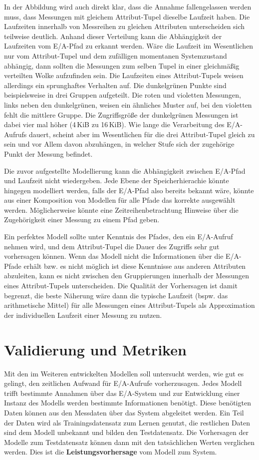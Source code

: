 \documentclass[
	12pt,
	a4paper,
	BCOR10mm,
	DIV14,
	listof=totoc,
	bibliography=totoc,
	headsepline
]{scrreprt}
\begin{document}
In der Abbildung wird auch direkt klar, dass die Annahme fallengelassen werden muss, dass Messungen mit gleichem Attribut-Tupel dieselbe Laufzeit haben. Die Laufzeiten innerhalb von Messreihen zu gleichen Attributen unterscheiden sich teilweise deutlich.
Anhand dieser Verteilung kann die Abhängigkeit der Laufzeiten vom E/A-Pfad zu erkannt werden.
Wäre die Laufzeit im Wesentlichen nur vom Attribut-Tupel und dem \glqq zufälligen\grqq{} momentanen Systemzustand abhängig, dann sollten die Messungen zum selben Tupel in einer gleichmäßig verteilten Wolke aufzufinden sein.
Die Laufzeiten eines Attribut-Tupels weisen allerdings ein sprunghaftes Verhalten auf. Die dunkelgrünen Punkte sind beispielsweise in drei Gruppen aufgeteilt.
Die roten und violetten Messungen, links neben den dunkelgrünen, weisen ein ähnliches Muster auf, bei den violetten fehlt die mittlere Gruppe.
Die Zugriffsgröße der dunkelgrünen Messungen ist dabei vier mal höher (4\,KiB zu 16\,KiB).
Wie lange die Verarbeitung des E/A-Aufrufs dauert, scheint aber im Wesentlichen für die drei Attribut-Tupel gleich zu sein und vor Allem davon abzuhängen, in welcher Stufe sich der zugehörige Punkt der Messung befindet.\medskip

Die zuvor aufgestellte Modellierung kann die Abhängigkeit zwischen E/A-Pfad und Laufzeit nicht wiedergeben.
Jede Ebene der Speicherhierachie könnte hingegen modelliert werden, falls der E/A-Pfad also bereits bekannt wäre, könnte aus einer Komposition von Modellen für alle Pfade das korrekte ausgewählt werden.
Möglicherweise könnte eine Zeitreihenbetrachtung Hinweise über die Zugehörigkeit einer Messung zu einem Pfad geben. 

Ein perfektes Modell sollte unter Kenntnis des Pfades, den ein E/A-Aufruf nehmen wird, und dem Attribut-Tupel die Dauer des Zugriffs sehr gut vorhersagen können. Wenn das Modell nicht die Informationen über die E/A-Pfade erhält bzw. es nicht möglich ist  diese Kenntnisse aus anderen Attributen abzuleiten, kann es nicht zwischen den Gruppierungen innerhalb der Messungen eines Attribut-Tupels unterscheiden. Die Qualität der Vorhersagen ist damit begrenzt, die beste Näherung wäre dann die typische Laufzeit (bspw. das arithmetische Mittel) für alle Messungen eines Attribut-Tupels als Approximation der individuellen Laufzeit einer Messung zu nutzen.

\section{Validierung und Metriken}
\label{analyse:valid}
Mit den im Weiteren entwickelten Modellen soll untersucht werden, wie gut es gelingt, den zeitlichen Aufwand für E/A-Aufrufe vorherzusagen. 
Jedes Modell trifft bestimmte Annahmen über das E/A-System und zur Entwicklung einer Instanz des Modells werden bestimmte Informationen benötigt.
Diese benötigten Daten können aus den Messdaten über das System abgeleitet werden.
Ein Teil der Daten wird als Trainingsdatensatz zum Lernen genutzt, die restlichen Daten sind dem Modell unbekannt und bilden den Testdatensatz. Die Vorhersagen der Modelle zum Testdatensatz können dann mit den tatsächlichen Werten verglichen werden. Dies ist die \textbf{Leistungsvorhersage} vom Modell zum System. \medskip
\end{document}
